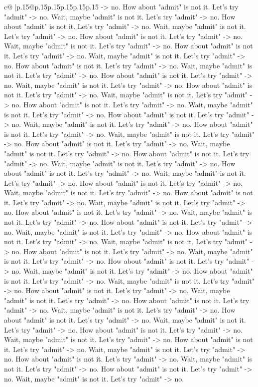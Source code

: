 \documentclass{article}
\begin{document}
{\begin{supertabular}{c@{$\;$}|p{.15\linewidth}@{}p{.15\linewidth}p{.15\linewidth}p{.15\linewidth}p{.15\linewidth}p{.15\linewidth}}
{{{{-}> no. How about "admit" is not it. Let's try "admit" {-}> no. Wait, maybe "admit" is not it. Let's try "admit" {-}> no. How about "admit" is not it. Let's try "admit" {-}> no. Wait, maybe "admit" is not it. Let's try "admit" {-}> no. How about "admit" is not it. Let's try "admit" {-}> no. Wait, maybe "admit" is not it. Let's try "admit" {-}> no. How about "admit" is not it. Let's try "admit" {-}> no. Wait, maybe "admit" is not it. Let's try "admit" {-}> no. How about "admit" is not it. Let's try "admit" {-}> no. Wait, maybe "admit" is not it. Let's try "admit" {-}> no. How about "admit" is not it. Let's try "admit" {-}> no. Wait, maybe "admit" is not it. Let's try "admit" {-}> no. How about "admit" is not it. Let's try "admit" {-}> no. Wait, maybe "admit" is not it. Let's try "admit" {-}> no. How about "admit" is not it. Let's try "admit" {-}> no. Wait, maybe "admit" is not it. Let's try "admit" {-}> no. How about "admit" is not it. Let's try "admit" {-}> no. Wait, maybe "admit" is not it. Let's try "admit" {-}> no. How about "admit" is not it. Let's try "admit" {-}> no. Wait, maybe "admit" is not it. Let's try "admit" {-}> no. How about "admit" is not it. Let's try "admit" {-}> no. Wait, maybe "admit" is not it. Let's try "admit" {-}> no. How about "admit" is not it. Let's try "admit" {-}> no. Wait, maybe "admit" is not it. Let's try "admit" {-}> no. How about "admit" is not it. Let's try "admit" {-}> no. Wait, maybe "admit" is not it. Let's try "admit" {-}> no. How about "admit" is not it. Let's try "admit" {-}> no. Wait, maybe "admit" is not it. Let's try "admit" {-}> no. How about "admit" is not it. Let's try "admit" {-}> no. Wait, maybe "admit" is not it. Let's try "admit" {-}> no. How about "admit" is not it. Let's try "admit" {-}> no. Wait, maybe "admit" is not it. Let's try "admit" {-}> no. How about "admit" is not it. Let's try "admit" {-}> no. Wait, maybe "admit" is not it. Let's try "admit" {-}> no. How about "admit" is not it. Let's try "admit" {-}> no. Wait, maybe "admit" is not it. Let's try "admit" {-}> no. How about "admit" is not it. Let's try "admit" {-}> no. Wait, maybe "admit" is not it. Let's try "admit" {-}> no. How about "admit" is not it. Let's try "admit" {-}> no. Wait, maybe "admit" is not it. Let's try "admit" {-}> no. How about "admit" is not it. Let's try "admit" {-}> no. Wait, maybe "admit" is not it. Let's try "admit" {-}> no. How about "admit" is not it. Let's try "admit" {-}> no. Wait, maybe "admit" is not it. Let's try "admit" {-}> no. How about "admit" is not it. Let's try "admit" {-}> no. Wait, maybe "admit" is not it. Let's try "admit" {-}> no. How about "admit" is not it. Let's try "admit" {-}> no. Wait, maybe "admit" is not it. Let's try "admit" {-}> no. How about "admit" is not it. Let's try "admit" {-}> no. Wait, maybe "admit" is not it. Let's try "admit" {-}> no. How about "admit" is not it. Let's try "admit" {-}> no. Wait, maybe "admit" is not it. Let's try "admit" {-}> no. How about "admit" is not it. Let's try "admit" {-}> no. Wait, maybe "admit" is not it. Let's try "admit" {-}> no. How about "admit" is not it. Let's try "admit" {-}> no. Wait, maybe "admit" is not it. Let's try "admit" {-}> no. }}}
\end{supertabular}}
\end{document}
